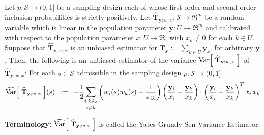 \documentclass{article}
\begin{document}
\begin{proposition}
\mbox{}
\vskip 0.1cm
\noindent
Let $p : \mathcal{S} \longrightarrow (0,1]$ be a sampling design each of whose
first-order and second-order inclusion probabilities is strictly positively.
Let $\widehat{\mathbf{T}}_{\mathbf{y};w,x} : \mathcal{S} \longrightarrow \Re^{m}$
be a random variable  which is linear in the population parameter
$\mathbf{y} : U \longrightarrow \Re^{m}$
and calibrated with respect to the population parameter $x : U \longrightarrow \Re$,
with $x_{k} \neq 0$ for each $k \in U$.
Suppose that $\widehat{\mathbf{T}}_{\mathbf{y};w,x}$ is an unbiased estimator for
$\mathbf{T}_{\mathbf{y}} := \underset{k \in U}{\sum}\mathbf{y}_{k}$, for arbitrary $\mathbf{y}$.
Then, the following is an unbiased estimator of the variance
$\textnormal{Var}\!\left[\;\widehat{\mathbf{T}}_{\mathbf{y};w,x} \;\right]$ of $\widehat{\mathbf{T}}_{\mathbf{y};w,x} $:
For each $s \in \mathcal{S}$ admissible in the sampling design $p : \mathcal{S} \longrightarrow (0,1]$,
\begin{equation*}
\widehat{\textnormal{Var}}\!\left[\;\widehat{\mathbf{T}}_{\mathbf{y};w,x} \;\right]\!(s)
\;\;:=\;\;
-\dfrac{1}{2}\underset{i\neq k}{\sum_{i,k\in s}}\left(w_{i}(s)w_{k}(s) - \dfrac{1}{\pi_{ik}}\right)
\left(\dfrac{\mathbf{y}_{i}}{x_{i}} - \dfrac{\mathbf{y}_{k}}{x_{k}}\right)\cdot\left(\dfrac{\mathbf{y}_{i}}{x_{i}} - \dfrac{\mathbf{y}_{k}}{x_{k}}\right)^{T}
x_{i}\,x_{k}
\end{equation*}
\end{proposition}

\noindent
\textbf{Terminology:}\quad
$\widehat{\textnormal{Var}}\!\left[\;\widehat{\mathbf{T}}_{\mathbf{y};w,x} \;\right]$ is called the Yates-Grundy-Sen Variance Estimator.
\end{document}
